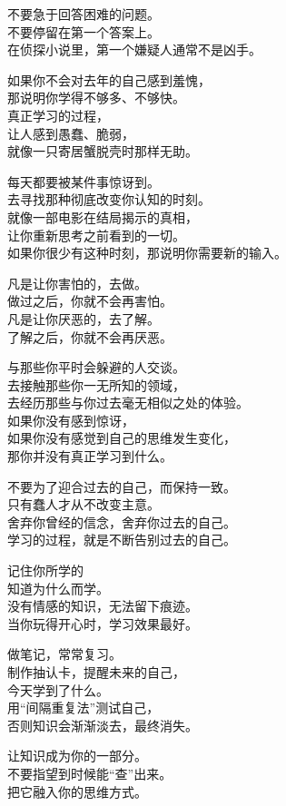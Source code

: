 \documentclass[
]{article}
\begin{document}
不要急于回答困难的问题。\\
不要停留在第一个答案上。\\
在侦探小说里，第一个嫌疑人通常不是凶手。

如果你不会对去年的自己感到羞愧，\\
那说明你学得不够多、不够快。\\
真正学习的过程，\\
让人感到愚蠢、脆弱，\\
就像一只寄居蟹脱壳时那样无助。

每天都要被某件事惊讶到。\\
去寻找那种彻底改变你认知的时刻。\\
就像一部电影在结局揭示的真相，\\
让你重新思考之前看到的一切。\\
如果你很少有这种时刻，那说明你需要新的输入。

凡是让你害怕的，去做。\\
做过之后，你就不会再害怕。\\
凡是让你厌恶的，去了解。\\
了解之后，你就不会再厌恶。

与那些你平时会躲避的人交谈。\\
去接触那些你一无所知的领域，\\
去经历那些与你过去毫无相似之处的体验。\\
如果你没有感到惊讶，\\
如果你没有感觉到自己的思维发生变化，\\
那你并没有真正学习到什么。

不要为了迎合过去的自己，而保持一致。\\
只有蠢人才从不改变主意。\\
舍弃你曾经的信念，舍弃你过去的自己。\\
学习的过程，就是不断告别过去的自己。

记住你所学的\\
知道为什么而学。\\
没有情感的知识，无法留下痕迹。\\
当你玩得开心时，学习效果最好。

做笔记，常常复习。\\
制作抽认卡，提醒未来的自己，\\
今天学到了什么。\\
用``间隔重复法''测试自己，\\
否则知识会渐渐淡去，最终消失。

让知识成为你的一部分。\\
不要指望到时候能``查''出来。\\
把它融入你的思维方式。
\end{document}
